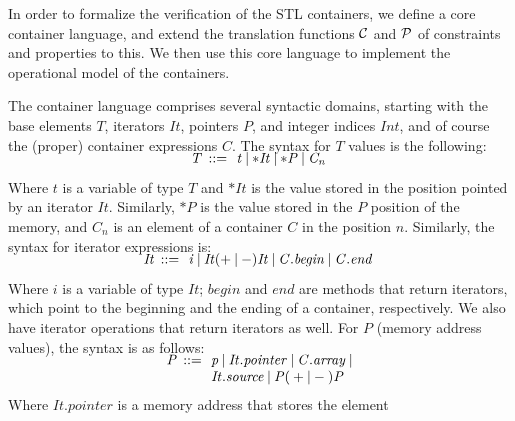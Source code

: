 \documentclass[a4paper]{llncs}
\begin{document}
In order to formalize the verification of the STL containers,
we define a core container language, and extend the translation
functions $\cal C$ and  $\cal P$ of constraints and properties to this.
We then use this core language to implement the operational model
of the containers.

The container language comprises several syntactic domains, starting with
the base elements $\mathit{T}$, iterators $\mathit{It}$, pointers $\mathit{P}$,
and integer indices $\mathit{Int}$, and of course the (proper)
container expressions $\mathit{C}$. The syntax for $\mathit{T}$
values is the following:
%
\[\begin{array}{r@{\:\:}c@{\:\:}l}\label{element-semantics}
\\[-5ex]
\mathit{T}   & ::= & \: \mathit{t} \: | \: \mathit{*It} \: | \: \mathit{*P} \: | \: \mathit{C_n} \:  \\
\end{array}
\]
%
Where $\mathit{t}$ is a variable of type $\mathit{T}$ and
$\mathit{*It}$ is the value stored in the position pointed
by an iterator $\mathit{It}$. Similarly, $\mathit{*P}$ is the value
stored in the $\mathit{P}$ position of the memory, and $\mathit{C_n}$ is
an element of a container $\mathit{C}$ in the position $\mathit{n}$.
Similarly, the syntax for iterator expressions is:
%
\[\begin{array}{r@{\:\:}c@{\:\:}l}\label{iterator-semantics}
\\[-5ex]
\mathit{It}   & ::= & \: \mathit{i} \: | \: \mathit{It} ( + \: | \: - ) \mathit{It} \: | \: \mathit{C.begin} \: | \: \mathit{C.end} \:  \\
\end{array}
\]
%
Where $\mathit{i}$ is a variable of type $\mathit{It}$;
$\mathit{begin}$ and $\mathit{end}$ are methods
that return iterators, which point to the beginning
and the ending of a container, respectively. We also have
iterator operations that return iterators as well.
For $\mathit{P}$ (memory address values), the syntax is as follows:
%
\[\begin{array}{r@{\:\:}c@{\:\:}l}\label{pointer-semantics}
\\[-5ex]
\mathit{P}  & ::= & \: \mathit{p} \: | \: \mathit{It.pointer} \: | \: \mathit{C.array} \: | \\
            &     & \: \mathit{It.source} \: | \: \mathit{P}  ( \: + \: | \: - \: )  \textit{P} \: \\
\end{array}
\]
%
Where $\mathit{It.pointer}$ is a memory address that stores the element
\end{document}

